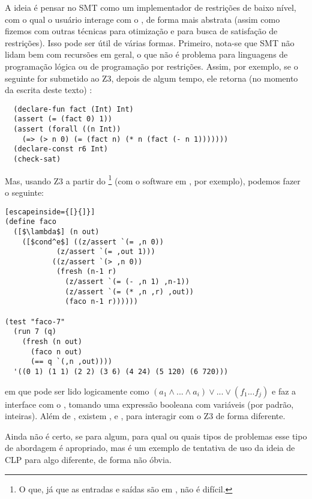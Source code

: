 \documentclass{article}
\begin{document}
A ideia é pensar no  SMT como um implementador de
restrições de baixo nível, com o qual o usuário interage com o
, de forma mais abstrata (assim como fizemos com outras
técnicas para otimização e para busca de satisfação de
restrições). Isso pode ser útil de várias formas. Primeiro, nota-se
que  SMT não lidam bem com recursões em geral, o que
não é problema para linguagens de programação lógica ou de programação
por restrições. Assim, por exemplo, se o seguinte for submetido ao Z3,
depois de algum tempo, ele retorna (no momento da escrita deste texto)
:

\begin{lstlisting}
  (declare-fun fact (Int) Int)
  (assert (= (fact 0) 1))
  (assert (forall ((n Int))
    (=> (> n 0) (= (fact n) (* n (fact (- n 1)))))))
  (declare-const r6 Int)
  (check-sat)
\end{lstlisting}

Mas, usando Z3 a partir do \footnote{O que, já que as
  entradas e saídas são em , não é difícil.} (com o
software em \cite{namin}, por exemplo), podemos fazer o seguinte:

\begin{lstlisting}[escapeinside={[}{]}]
(define faco
  ([$\lambda$] (n out)
    ([$cond^e$] ((z/assert `(= ,n 0))
            (z/assert `(= ,out 1)))
           ((z/assert `(> ,n 0))
            (fresh (n-1 r)
              (z/assert `(= (- ,n 1) ,n-1))
              (z/assert `(= (* ,n ,r) ,out))
              (faco n-1 r))))))

(test "faco-7"
  (run 7 (q)
    (fresh (n out)
      (faco n out)
      (== q `(,n ,out))))
  '((0 1) (1 1) (2 2) (3 6) (4 24) (5 120) (6 720)))

\end{lstlisting}

\noindent em que  pode ser lido logicamente como $(a_1 \wedge ... \wedge a_i) \vee
... \vee (f_1 ... f_j)$ e  faz a interface com o
, tomando uma expressão booleana com variáveis (por
padrão, inteiras). Além de , existem ,
 e , para interagir com o Z3 de forma
diferente.

Ainda não é certo, se para algum, para qual ou quais tipos de
problemas esse tipo de abordagem é apropriado, mas é um exemplo de
tentativa de uso da ideia de CLP para algo diferente, de forma não
óbvia.
           
\end{document}
